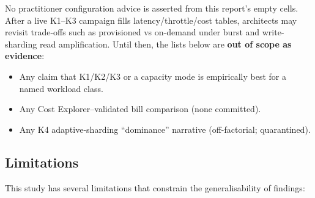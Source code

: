 No practitioner configuration advice is asserted from this report's empty cells. After a live K1--K3 campaign fills latency/throttle/cost tables, architects may revisit trade-offs such as provisioned vs on-demand under burst and write-sharding read amplification. Until then, the lists below are \textbf{out of scope as evidence}:

\begin{itemize}
    \item Any claim that K1/K2/K3 or a capacity mode is empirically best for a named workload class.
    \item Any Cost Explorer--validated bill comparison (none committed).
    \item Any K4 adaptive-sharding ``dominance'' narrative (off-factorial; quarantined).
\end{itemize}

\subsection{Limitations}

This study has several limitations that constrain the generalisability of findings:

